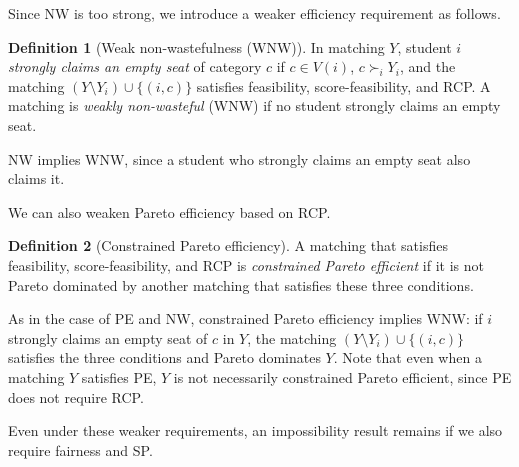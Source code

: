 \documentclass[a4paper,twoside]{article}
\theoremstyle{definition}
\newtheorem{definition}{Definition}
\begin{document}
Since NW is too strong, we introduce a weaker efficiency requirement as follows. 
\begin{definition}[Weak non-wastefulness (WNW)]
\label{def:wnw}
In matching $Y$, student $i$ \emph{strongly claims an empty seat} of category $c$ if
$c\in V(i)$, $c\succ_i Y_i$, and the matching $(Y\setminus Y_i)\cup\{(i,c)\}$ satisfies
feasibility, score-feasibility, and RCP.
A matching is \emph{weakly non-wasteful} (WNW) if no student strongly claims an empty
seat.
\end{definition}

NW implies WNW, since a student who strongly claims an empty seat also
claims it.

We can also weaken Pareto efficiency based on RCP. 
\begin{definition}[Constrained Pareto efficiency]
\label{def:cpe}
A matching that satisfies feasibility, score-feasibility, and RCP is
\emph{constrained Pareto efficient} if it is not Pareto dominated by another matching
that satisfies these three conditions.
\end{definition}
As in the case of PE and NW, constrained Pareto efficiency implies WNW:
if $i$ strongly claims an empty seat of $c$ in $Y$, the matching
$(Y\setminus Y_i)\cup\{(i,c)\}$ satisfies the three conditions and Pareto dominates $Y$.
Note that even when a matching $Y$ satisfies PE,
$Y$ is not necessarily constrained Pareto efficient, 
since PE does not require RCP. 

Even under these weaker requirements, an impossibility result remains if we also
require fairness and SP.
\end{document}

